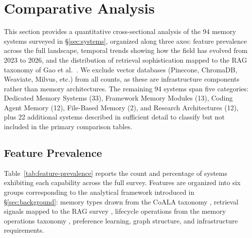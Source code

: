 \section{Comparative Analysis}
\label{sec:comparison}

This section provides a quantitative cross-sectional analysis of the 94 memory
systems surveyed in \S\ref{sec:systems}, organized along three axes: feature
prevalence across the full landscape, temporal trends showing how the field has
evolved from 2023 to 2026, and the distribution of retrieval sophistication
mapped to the RAG taxonomy of Gao et al.~\cite{gao2023rag}. We exclude vector
databases (Pinecone, ChromaDB, Weaviate, Milvus, etc.) from all counts, as
these are infrastructure components rather than memory architectures. The
remaining 94 systems span five categories: Dedicated Memory Systems (33),
Framework Memory Modules (13), Coding Agent Memory (12), File-Based Memory (2),
and Research Architectures (12), plus 22 additional systems described in
sufficient detail to classify but not included in the primary comparison
tables.

\subsection{Feature Prevalence}
\label{sec:feature-prevalence}

Table~\ref{tab:feature-prevalence} reports the count and percentage of systems
exhibiting each capability across the full survey. Features are organized into
six groups corresponding to the analytical framework introduced in
\S\ref{sec:background}: memory types drawn from the CoALA taxonomy
\cite{sumers2024coala}, retrieval signals mapped to the RAG survey
\cite{gao2023rag}, lifecycle operations from the memory operations taxonomy
\cite{zhang2024survey}, preference learning, graph structure, and
infrastructure requirements.

